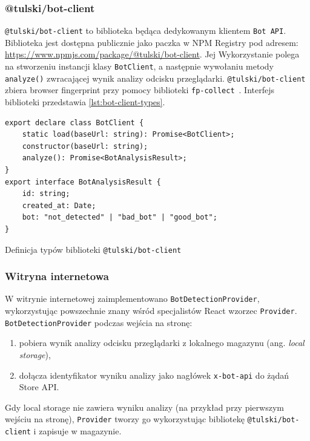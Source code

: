 \subsubsection{@tulski/bot-client}

\texttt{@tulski/bot-client} to biblioteka będąca dedykowanym klientem \texttt{Bot API}.
Biblioteka jest dostępna publicznie jako paczka w NPM Registry pod adresem: \url{https://www.npmjs.com/package/@tulski/bot-client}.
Jej Wykorzystanie polega na stworzeniu instancji klasy \texttt{BotClient}, a następnie wywołaniu metody \texttt{analyze()} zwracającej wynik analizy odcisku przeglądarki.
\texttt{@tulski/bot-client} zbiera browser fingerprint przy pomocy biblioteki \texttt{fp-collect}~\cite{github-fp-collect}.
Interfejs biblioteki przedstawia \autoref{lst:bot-client-types}.

\begin{listing}[H]
    \begin{verbatim}
export declare class BotClient {
    static load(baseUrl: string): Promise<BotClient>;
    constructor(baseUrl: string);
    analyze(): Promise<BotAnalysisResult>;
}
export interface BotAnalysisResult {
    id: string;
    created_at: Date;
    bot: "not_detected" | "bad_bot" | "good_bot";
}
    \end{verbatim}
    \caption{Definicja typów biblioteki \texttt{@tulski/bot-client}}
    \label{lst:bot-client-types}
\end{listing}

\subsubsection{Witryna internetowa}

W witrynie internetowej zaimplementowano \texttt{BotDetectionProvider}, wykorzystując powszechnie znany wśród specjalistów React wzorzec \texttt{Provider}.
\texttt{BotDetectionProvider} podczas wejścia na stronę:
\begin{enumerate}
    \item pobiera wynik analizy odcisku przeglądarki z lokalnego magazynu (ang. \emph{local storage}),
    \item dołącza identyfikator wyniku analizy jako nagłówek \texttt{x-bot-api} do żądań Store API\@.
\end{enumerate}
Gdy local storage nie zawiera wyniku analizy (na przykład przy pierwszym wejściu na stronę), \texttt{Provider} tworzy go wykorzystując bibliotekę \texttt{@tulski/bot-client} i zapisuje w magazynie.

